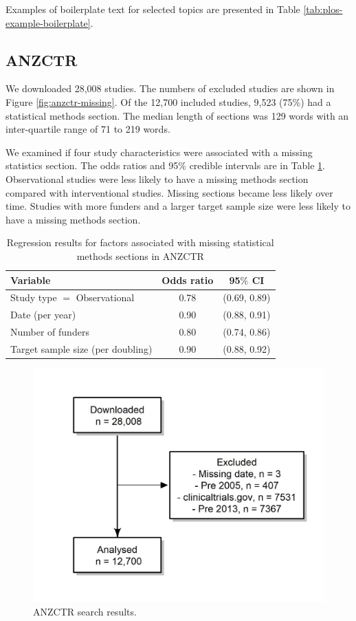 \documentclass[12pt]{article}
\begin{document}
Examples of boilerplate text for selected topics are presented in Table
\ref{tab:plos-example-boilerplate}.

\subsection{ANZCTR}

We downloaded 28,008 studies. The numbers of excluded studies are shown
in Figure \ref{fig:anzctr-missing}. Of the 12,700 included studies,
9,523 (75\%) had a statistical methods section. The median length of
sections was 129 words with an inter-quartile range of 71 to 219 words.

We examined if four study characteristics were associated with a missing
statistics section. The odds ratios and 95\% credible intervals are in
Table \ref{tab:anzctr-missing-odds}. Observational studies were less
likely to have a missing methods section compared with interventional
studies. Missing sections became less likely over time. Studies with
more funders and a larger target sample size were less likely to have a
missing methods section.

\begin{table}[]
\centering
\caption{Regression results for factors associated with missing statistical methods sections in ANZCTR}
\label{tab:anzctr-missing-odds}
\begin{tabular}{lcc}
\hline
Variable & Odds ratio & 95$\%$ CI \\
\hline
Study type $=$ Observational & 0.78 & (0.69, 0.89) \\
Date (per year) & 0.90 & (0.88, 0.91) \\
Number of funders & 0.80 & (0.74, 0.86) \\
Target sample size (per doubling) & 0.90 & (0.88, 0.92)\\
\hline
\end{tabular}
\end{table}

\begin{figure}

{\centering \includegraphics[width=0.7\linewidth]{figures/excluded_anzctr_missing} 

}

\caption{\label{fig:anzctr-missing}ANZCTR search results.}\label{fig:unnamed-chunk-8}
\end{figure}
\end{document}
